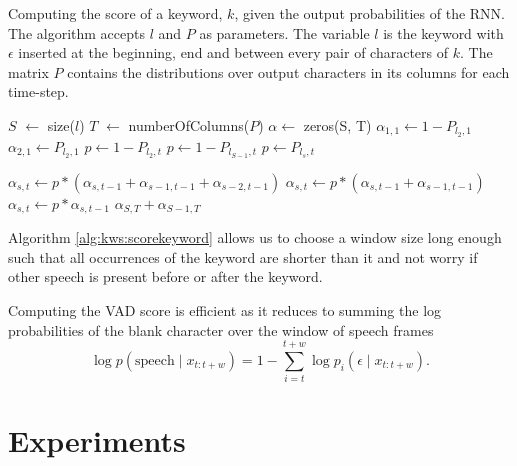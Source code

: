 \begin{algorithm}
\caption{Computing the score of a keyword, $k$, given the output probabilities
         of the RNN. The algorithm accepts $l$ and $P$ as parameters. The variable
         $l$ is the keyword with $\epsilon$ inserted at the beginning, end and
         between every pair of characters of $k$. The matrix $P$ contains the
         distributions over output characters in its columns for each time-step.}
\label{alg:kws:scorekeyword}
\begin{algorithmic}
\State $S$ $\gets$ size($l$)
\State $T$ $\gets$ numberOfColumns($P$)
\State $\alpha \gets$ zeros(S, T)
\State $\alpha_{1, 1} \gets 1 - P_{l_2, 1}$
\State $\alpha_{2, 1} \gets P_{l_{2}, 1}$
                \State $p \gets 1 - P_{l_2, t}$
                \State $p \gets 1 - P_{l_{S - 1}, t}$
            \Else
                \State $p \gets P_{l_{s}, t}$
            \EndIf
            
                \State $\alpha_{s, t} \gets p * (\alpha_{s, t-1} + \alpha_{s-1, t-1} + \alpha_{s-2, t-1})$
                \State $\alpha_{s, t} \gets p * (\alpha_{s, t-1} + \alpha_{s-1, t-1})$
            \Else
                \State $\alpha_{s, t} \gets p * \alpha_{s, t-1}$
            \EndIf
        \EndFor
    \EndFor
    \State \Return $\alpha_{S, T} + \alpha_{S-1, T}$
\EndFunction
\end{algorithmic}
\end{algorithm}

Algorithm \ref{alg:kws:scorekeyword} allows us to choose a window size long
enough such that all occurrences of the keyword are shorter than it and not
worry if other speech is present before or after the keyword.

Computing the VAD score is efficient as it reduces to summing the log
probabilities of the blank character over the window of speech frames
\begin{equation}
\log p(\mathrm{speech} \mid x_{t:t+w}) = 1 - \sum_{i=t}^{t + w} \log p_i(\epsilon \mid x_{t:t+w}).
\end{equation}

\section{Experiments}
\label{sec:kws:experiments}

